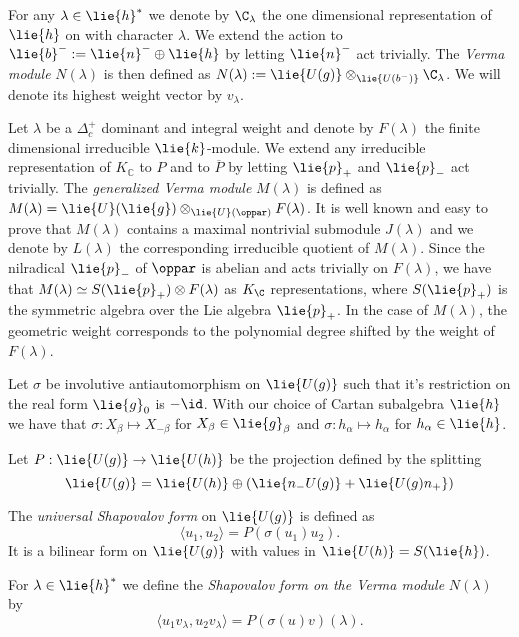 For any $\lambda\in\lie{h}^*$ we denote by $\C_\lambda$ the one dimensional representation of $\lie{h}$ on with character $\lambda$. We extend the action to $\lie{b}^- := \lie{n}^-\oplus\lie{h}$ by letting $\lie{n}^-$ act trivially. The \emph{Verma module} $N(\lambda)$ is then defined as $N(\lambda) := \lie{U(g)}\otimes_{\lie{U(b^-)}} \C_\lambda$. We will denote its highest weight vector by $v_\lambda$.

Let $\lambda$ be a $\Delta_c^+$ dominant and integral weight and denote by $F(\lambda)$ the finite dimensional irreducible $\lie{k}$-module.  We extend any irreducible representation of $K_\mathbb{C}$ to $P$ and to $\overline{P}$ by letting $\lie{p}_+$ and $\lie{p}_-$ act trivially. The \emph{generalized Verma module} $M(\lambda)$ is defined as $M(\lambda) = \lie{U}(\lie{g}) \otimes_{\lie{U}(\oppar)} F(\lambda)$. It is well known and easy to prove that $M(\lambda)$ contains a maximal nontrivial submodule $J(\lambda)$ and we denote by $L(\lambda)$ the corresponding irreducible quotient of $M(\lambda)$. Since the nilradical $\lie{p}_-$ of $\oppar$ is abelian and acts trivially on $F(\lambda)$, we have that $M(\lambda) \simeq S(\lie{p}_+)\otimes F(\lambda)$ as $K_\C$ representations, where $S(\lie{p}_+)$ is the symmetric algebra  over the Lie algebra $\lie{p}_+$.
In the case of $M(\lambda)$, the geometric weight corresponds to the polynomial degree shifted by the weight of $F(\lambda)$.%

Let $\sigma$ be involutive antiautomorphism on $\lie{U(g)}$ such that it's restriction on the real form $\lie{g}_0$ is $-\id$. With our choice of Cartan subalgebra $\lie{h}$ we have that $\sigma: X_\beta \mapsto X_{-\beta}$ for $X_\beta \in \lie{g}_\beta$ and $\sigma: h_\alpha \mapsto h_\alpha$ for $h_\alpha \in \lie{h}$.

Let $P: \lie{U(g)} \to \lie{U(h)}$ be the projection defined by the splitting \[\lie{U(g)} = \lie{U(h)}\oplus \left( \lie{n_-U(g)} + \lie{U(g)n_+} \right)\]

\begin{definition}
  The \emph{universal Shapovalov form} on $\lie{U(g)}$ is defined as \[\langle u_1 , u_2 \rangle = P(\sigma(u_1)u_2).\] It is a bilinear form on $\lie{U(g)}$ with values in $\lie{U(h)} = S(\lie{h})$.

  For $\lambda\in\lie{h}^*$ we define the \emph{Shapovalov form on the Verma module} $N(\lambda)$ by \[\langle u_1 v_\lambda , u_2 v_\lambda \rangle = P(\sigma(u)v)(\lambda).\]
\end{definition}

